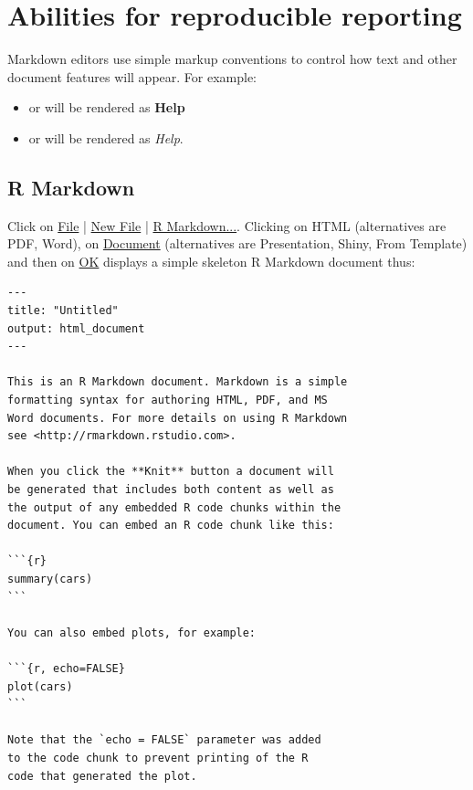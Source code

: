 \section{Abilities for reproducible reporting}
Markdown editors use simple markup conventions to control how text and
other document features will appear.  For example:
\begin{itemize}
\item[]  or  will be rendered as
\textbf{Help}
\item[]  or  will be rendered as {\em Help}.
\end{itemize}

\subsection{R Markdown}

Click on \underline{File} | \underline{New File} | \underline{R
  Markdown...}.  Clicking on HTML (alternatives are PDF, Word), on
\underline{Document} (alternatives are Presentation, Shiny, From
Template) and then on \underline{OK} displays a simple skeleton R
Markdown document thus:
\begin{verbatim}
---
title: "Untitled"
output: html_document
---

This is an R Markdown document. Markdown is a simple
formatting syntax for authoring HTML, PDF, and MS
Word documents. For more details on using R Markdown
see <http://rmarkdown.rstudio.com>.

When you click the **Knit** button a document will
be generated that includes both content as well as
the output of any embedded R code chunks within the
document. You can embed an R code chunk like this:

```{r}
summary(cars)
```

You can also embed plots, for example:

```{r, echo=FALSE}
plot(cars)
```

Note that the `echo = FALSE` parameter was added
to the code chunk to prevent printing of the R
code that generated the plot.
\end{verbatim}


